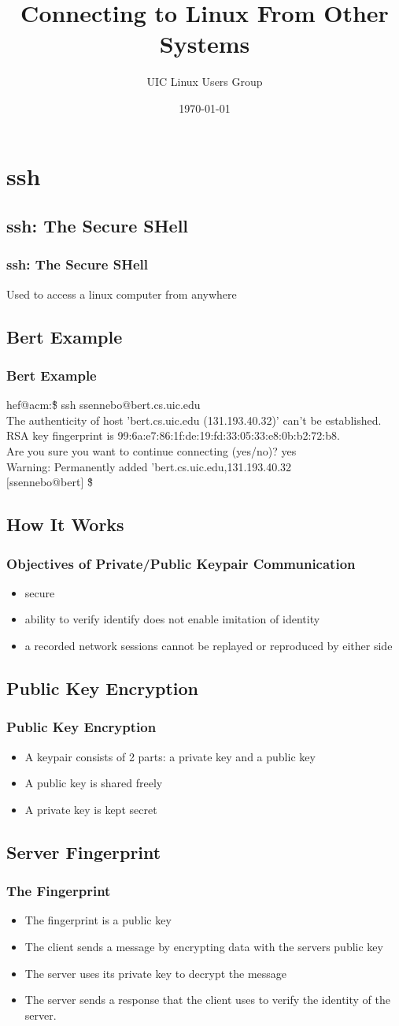 \documentclass[hyperref={pdfpagelabels=false}]{beamer}
\title{Connecting to Linux From Other Systems}
\author{UIC Linux Users Group}
\date{\today}
\begin{document}
\frame{\titlepage}
\section{ssh}
\subsection{ssh: The Secure SHell}
\frame
{
  \frametitle{ssh: The Secure SHell}
  Used to access a linux computer from anywhere
}
\subsection{Bert Example}
\frame
{
  \frametitle{Bert Example}
  hef@acm:\~\$ ssh ssennebo@bert.cs.uic.edu\\
  The authenticity of host 'bert.cs.uic.edu (131.193.40.32)' can't be established.\\
  RSA key fingerprint is 99:6a:e7:86:1f:de:19:fd:33:05:33:e8:0b:b2:72:b8.\\
  Are you sure you want to continue connecting (yes/no)? yes\\
  Warning: Permanently added 'bert.cs.uic.edu,131.193.40.32\\
  $[$ssennebo@bert$]$ \~\$
}
\subsection{How It Works}
\frame
{
  \frametitle{Objectives of Private/Public Keypair Communication}
  \begin{itemize}
  \item{secure}
  \item{ability to verify identify does not enable imitation of identity}
  \item{a recorded network sessions cannot be replayed or reproduced by either side}
  \end{itemize}
}
\subsection{Public Key Encryption}
\frame
{
    \frametitle{Public Key Encryption}
    \begin{itemize}
    \item{A keypair consists of 2 parts: a private key and a public key}
    \item{A public key is shared freely}
    \item{A private key is kept secret}
    \end{itemize}
}
\subsection{Server Fingerprint}
\frame
{
    \frametitle{The Fingerprint}
    \begin{itemize}
    \item{The fingerprint is a public key}
    \item{The client sends a message by encrypting data with the servers public key}
    \item{The server uses its private key to decrypt the message}
    \item{The server sends a response that the client uses to verify the identity of the server.}
    \end{itemize}
}
\end{document}
